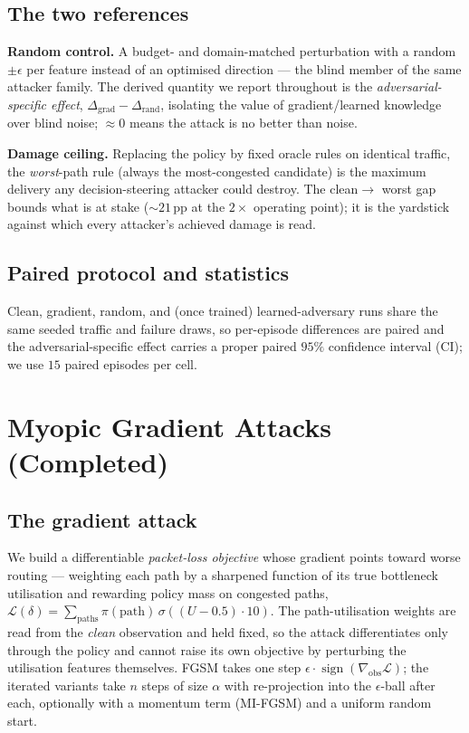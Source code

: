 \documentclass[10pt,journal,comsoc]{IEEEtran}
\begin{document}
\subsection{The two references}
\textbf{Random control.} A budget- and domain-matched perturbation with a random
$\pm\epsilon$ per feature instead of an optimised direction --- the blind member of the
same attacker family. The derived quantity we report throughout is the
\emph{adversarial-specific effect}, $\Delta_\text{grad}-\Delta_\text{rand}$, isolating
the value of gradient/learned knowledge over blind noise; $\approx0$ means the attack
is no better than noise.

\textbf{Damage ceiling.} Replacing the policy by fixed oracle rules on identical
traffic, the \emph{worst}-path rule (always the most-congested candidate) is the
maximum delivery any decision-steering attacker could destroy. The clean$\rightarrow$
worst gap bounds what is at stake ($\sim$$21$\,pp at the $2\times$ operating point); it
is the yardstick against which every attacker's achieved damage is read.

\subsection{Paired protocol and statistics}
Clean, gradient, random, and (once trained) learned-adversary runs share the same
seeded traffic and failure draws, so per-episode differences are paired and the
adversarial-specific effect carries a proper paired $95\%$ confidence interval (CI); we
use $15$ paired episodes per cell.

\section{Myopic Gradient Attacks (Completed)}
\label{sec:myopic}
\subsection{The gradient attack}
We build a differentiable \emph{packet-loss objective} whose gradient points toward
worse routing --- weighting each path by a sharpened function of its true bottleneck
utilisation and rewarding policy mass on congested paths,
$\mathcal{L}(\delta)=\sum_\text{paths}\pi(\text{path})\,\sigma((U-0.5)\cdot10)$. The
path-utilisation weights are read from the \emph{clean} observation and held fixed, so
the attack differentiates only through the policy and cannot raise its own objective by
perturbing the utilisation features themselves. FGSM takes one step
$\epsilon\cdot\operatorname{sign}(\nabla_\text{obs}\mathcal{L})$; the iterated variants
take $n$ steps of size $\alpha$ with re-projection into the $\epsilon$-ball after each,
optionally with a momentum term (MI-FGSM) and a uniform random start.
\end{document}
